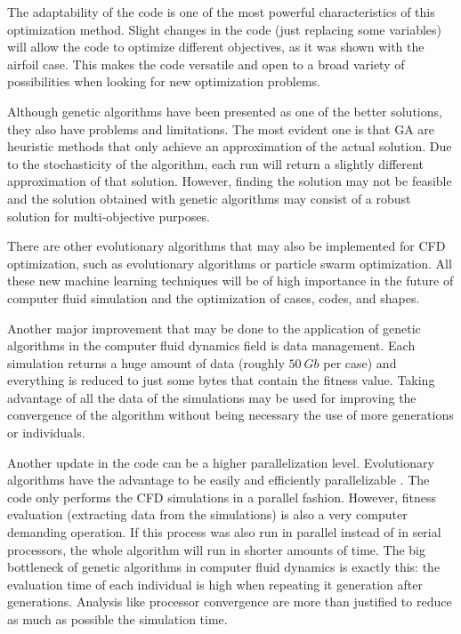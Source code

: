The adaptability of the code is one of the most powerful characteristics of this optimization method. Slight changes in the code (just replacing some variables) will allow the code to optimize different objectives, as it was shown with the airfoil case. This makes the code versatile and open to a broad variety of possibilities when looking for new optimization problems.

Although genetic algorithms have been presented as one of the better solutions, they also have problems and limitations. The most evident one is that GA are heuristic methods that only achieve an approximation of the actual solution. Due to the stochasticity of the algorithm, each run will return a slightly different approximation of that solution. However, finding the  solution may not be feasible and the solution obtained with genetic algorithms may consist of a robust solution for multi-objective purposes. 

There are other evolutionary algorithms that may also be implemented for CFD optimization, such as evolutionary algorithms or particle swarm optimization. All these new machine learning techniques will be of high importance in the future of computer fluid simulation and the optimization of cases, codes, and shapes. 

Another major improvement that may be done to the application of genetic algorithms in the computer fluid dynamics field is data management. Each simulation returns a huge amount of data (roughly $50\ Gb$ per case) and everything is reduced to just some bytes that contain the fitness value. Taking advantage of all the data of the simulations may be used for improving the convergence of the algorithm without being necessary the use of more generations or individuals. 

Another update in the code can be a higher parallelization level. Evolutionary algorithms have the advantage to be easily and efficiently parallelizable \cite{thevenin2008and}. The code only performs the CFD simulations in a parallel fashion. However, fitness evaluation (extracting data from the simulations) is also a very computer demanding operation. If this process was also run in parallel instead of in serial processors, the whole algorithm will run in shorter amounts of time. The big bottleneck of genetic algorithms in computer fluid dynamics is exactly this: the evaluation time of each individual is high when repeating it generation after generations. Analysis like processor convergence are more than justified to reduce as much as possible the simulation time.

